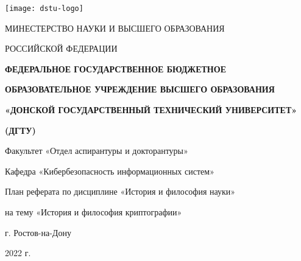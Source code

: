 \begin{titlepage}
	\centerline{\texttt{[image: dstu-logo]}}
	\vfill
	\centerline{МИНЕСТЕРСТВО НАУКИ И ВЫСШЕГО ОБРАЗОВАНИЯ}
	\centerline{РОССИЙСКОЙ ФЕДЕРАЦИИ}
	\vfill
	\centerline{\bf ФЕДЕРАЛЬНОЕ ГОСУДАРСТВЕННОЕ БЮДЖЕТНОЕ}
	\centerline{\bf ОБРАЗОВАТЕЛЬНОЕ УЧРЕЖДЕНИЕ ВЫСШЕГО ОБРАЗОВАНИЯ}
	\centerline{\bf «ДОНСКОЙ ГОСУДАРСТВЕННЫЙ ТЕХНИЧЕСКИЙ УНИВЕРСИТЕТ»}
	\centerline{\bf (ДГТУ)}
	\normalsize
	\vfill\vfill
	\centerline{Факультет «Отдел аспирантуры и докторантуры»}
	\centerline{Кафедра «Кибербезопасность информационных систем»}
	\vfill
	\vfill
	\centerline{План реферата по дисциплине «История и философия науки»}
	\centerline{на тему «История и философия криптографии»}
	\vfill
	\vfill
	\vfill
	\vfill
	\vfill
	\vfill
	\vfill
	\vfill
	\vfill
	
	\centerline{г. Ростов-на-Дону}
	\centerline{2022 г.}
	
\end{titlepage}
\setcounter{page}{2}